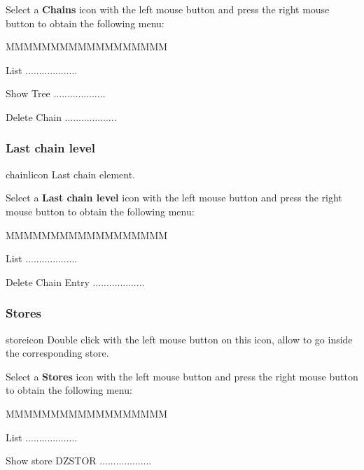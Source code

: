 Select a {\bf Chains} icon with the left mouse button and press
the right mouse button to obtain the following menu:


\begin{DLsf}{MMMMMMMMMMMMMMMMMM}
\item[List]                      ...................
\item[Show Tree]                 ...................
\item[Delete Chain]              ...................
\end{DLsf}


\subsubsection{Last chain level}
\begin{ICON}{chainlicon}
Last chain element.
\end{ICON}

Select a {\bf Last chain level} icon with the left mouse button and press
the right mouse button to obtain the following menu:


\begin{DLsf}{MMMMMMMMMMMMMMMMMM}
\item[List]                      ...................
\item[Delete Chain Entry]        ...................
\end{DLsf}


\subsubsection{\ZEBRA{} Stores}
\begin{ICON}{storeicon}
Double click with the left mouse button on this icon, allow to go inside the
corresponding \ZEBRA{} store.
\end{ICON}

Select a {\bf \ZEBRA{} Stores} icon with the left mouse button and press
the right mouse button to obtain the following menu:


\begin{DLsf}{MMMMMMMMMMMMMMMMMM}
\item[List]                      ...................
\item[Show store DZSTOR]         ...................
\end{DLsf}


